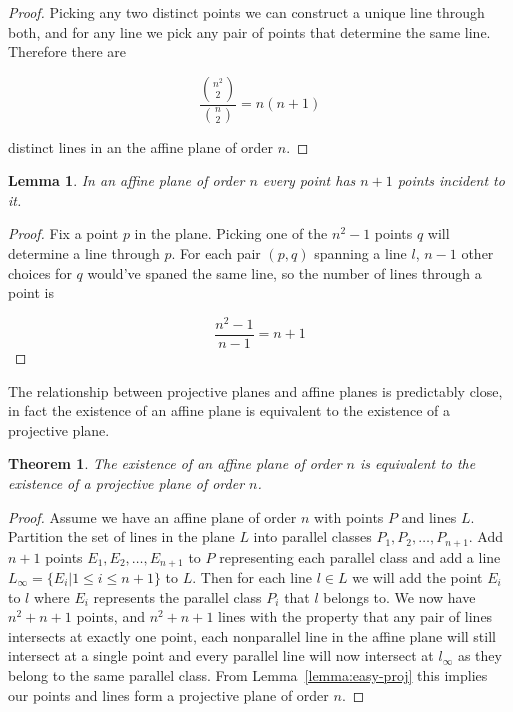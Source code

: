 \documentclass{article}
\newtheorem{lemma}{Lemma}
\newtheorem{theorem}{Theorem}
\begin{document}
\begin{proof}
  Picking any two distinct points we can construct a unique line through both, and for any line we pick any pair of points that determine the same line. Therefore there are

  \begin{equation}
\frac{\binom{n^{2}}{2}}{\binom{n}{2}} = n(n + 1)
\end{equation}

distinct lines in an the affine plane of order \(n\).
\end{proof}

\begin{lemma}
In an affine plane of order \(n\) every point has \(n + 1\) points incident to it.
\end{lemma}
\begin{proof}
  Fix a point \(p\) in the plane. Picking one of the \(n^{2} - 1\) points \(q\) will determine a line through \(p\). For each pair \((p, q)\) spanning a line \(l\), \(n - 1\) other choices for \(q\) would've spaned the same line, so the number of lines through a point is

  \begin{equation}
\frac{n^{2} - 1}{n - 1} = n + 1
\end{equation}
\end{proof}

The relationship between projective planes and affine planes is predictably close, in fact the existence of an affine plane is equivalent to the existence of a projective plane.

\begin{theorem}
The existence of an affine plane of order \(n\) is equivalent to the existence of a projective plane of order \(n\).
\end{theorem}
\begin{proof}
  Assume we have an affine plane of order \(n\) with points \(P\) and lines \(L\). Partition the set of lines in the plane \(L\) into parallel classes \(P_{1}, P_{2}, \ldots, P_{n + 1}\). Add \(n + 1\) points \(E_{1}, E_{2}, \ldots, E_{n + 1}\) to \(P\) representing each parallel class and add a line \(L_{\infty} = \{E_{i} | 1 \le i \le n + 1\}\) to \(L\).
  Then for each line \(l \in L\) we will add the point \(E_{i}\) to \(l\) where \(E_{i}\) represents the parallel class \(P_{i}\) that \(l\) belongs to. We now have \(n^{2} + n + 1\) points, and \(n^{2} + n + 1\) lines with the property that any pair of lines intersects at exactly one point, each nonparallel line in the affine plane will still intersect at a single point and every parallel line will now intersect at \(l_{\infty}\) as they belong to the same parallel class. From Lemma~\ref{lemma:easy-proj} this implies our points and lines form a projective plane of order \(n\).
\end{proof}
\end{document}
